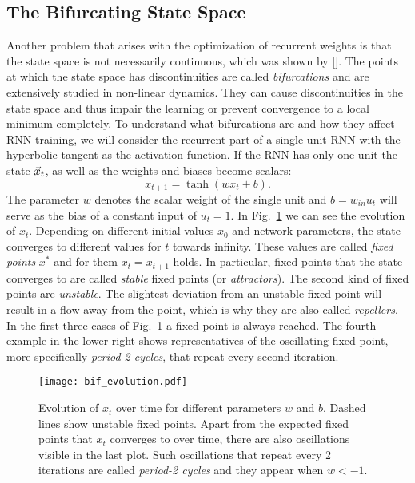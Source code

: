 \subsection{The Bifurcating State Space}%
\label{sub:the_bifurcating_state_space}

Another problem that arises with the optimization of recurrent weights is that
the state space is not necessarily continuous, which was shown by
[\cite{doya1992}].  The points at which the state space has discontinuities are
called \emph{bifurcations} and are extensively studied in non-linear dynamics.
They can cause discontinuities in the state space and thus impair the learning
or prevent convergence to a local minimum completely.  To understand what
bifurcations are and how they affect RNN training, we will consider the
recurrent part of a single unit RNN with the hyperbolic tangent as the
activation function.  If the RNN has only one unit the state $\vec{x}_t$, as well
as the weights and biases become scalars:
\begin{equation}
  \label{eq:single_unit_rnn}
  x_{t+1} = \tanh(w x_t + b).
\end{equation}
The parameter $w$ denotes the scalar weight of the single unit and $b = w_{in}
u_t$ will serve as the bias of a constant input of $u_t = 1$.  In
Fig.~\ref{fig:bif_evolution} we can see the evolution of $x_t$.  Depending on
different initial values $x_0$ and network parameters, the state converges to
different values for $t$ towards infinity. These values are called \emph{fixed
points} $x^*$ and for them $x_t = x_{t+1}$ holds.  In particular, fixed points
that the state converges to are called \emph{stable} fixed points (or
\emph{attractors}).  The second kind of fixed points are \emph{unstable}.  The
slightest deviation from an unstable fixed point will result in a flow away
from the point, which is why they are also called \emph{repellers}.  In the
first three cases of Fig.~\ref{fig:bif_evolution} a fixed point is always
reached. The fourth example in the lower right shows representatives of
the oscillating fixed point, more specifically \emph{period-2 cycles}, that
repeat every second iteration.
\begin{figure}
  \centering
  \texttt{[image: bif\_evolution.pdf]}
  \caption{Evolution of $x_t$ over time for different parameters $w$ and $b$.
    Dashed lines show unstable fixed points. Apart from the expected fixed points
    that $x_t$ converges to over time, there are also oscillations visible in
    the last plot. Such oscillations that repeat every 2 iterations are called
    \emph{period-2 cycles} and they appear when $w<-1$.}
  \label{fig:bif_evolution}
\end{figure}
